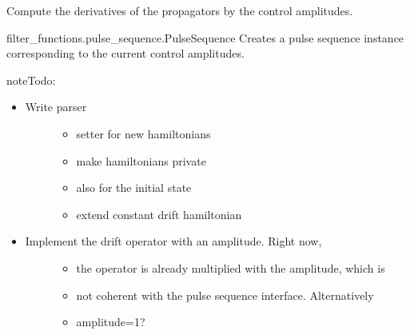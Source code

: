 \documentclass[letterpaper,10pt,english]{sphinxmanual}
\begin{document}
\begin{fulllineitems}
\begin{fulllineitems}
Compute the derivatives of the propagators by the control amplitudes.

\end{fulllineitems}



\begin{fulllineitems}
filter\_functions.pulse\_sequence.PulseSequence
Creates a pulse sequence instance corresponding to the current control
amplitudes.

\end{fulllineitems}


\begin{sphinxadmonition}{note}{\label{\detokenize{qsim:id42}}Todo:}\begin{itemize}
\item {} \begin{description}
\item[{Write parser}] \leavevmode\begin{itemize}
\item {} 
setter for new hamiltonians

\item {} 
make hamiltonians private

\item {} 
also for the initial state

\item {} 
extend constant drift hamiltonian

\end{itemize}

\end{description}

\item {} \begin{description}
\item[{Implement the drift operator with an amplitude. Right now,}] \leavevmode\begin{itemize}
\item {} 
the operator is already multiplied with the amplitude, which is

\item {} 
not coherent with the pulse sequence interface. Alternatively

\item {} 
amplitude=1?

\end{itemize}


\end{description}
\end{itemize}
\end{sphinxadmonition}
\end{fulllineitems}
\end{document}
